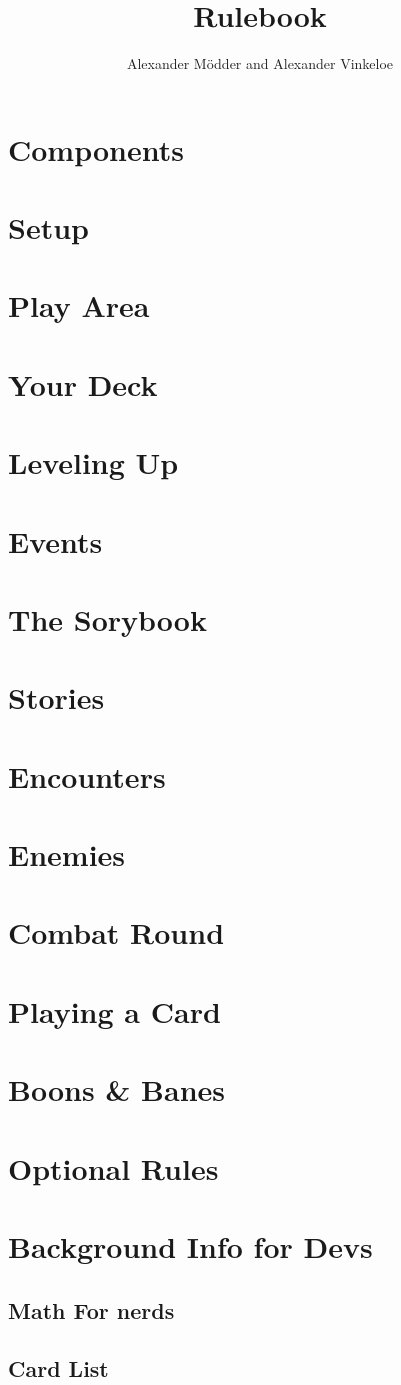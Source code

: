 \documentclass[english,10pt,a4paper]{article}
\title{Rulebook}
\author{Alexander Mödder and Alexander Vinkeloe}
\begin{document}
	\maketitle
	
	\section{Components}
	\section{Setup}
	\section{Play Area}
	\section{Your Deck}
	\section{Leveling Up}
	\section{Events}
	\section{The Sorybook}
	\section{Stories}
	\section{Encounters}
	\section{Enemies}
	\section{Combat Round}
	\section{Playing a Card}
	\section{Boons \& Banes}
	\section{Optional Rules}
	\section{Background Info for Devs}
	\subsection{Math For nerds}
	\subsection{Card List}
\end{document}

